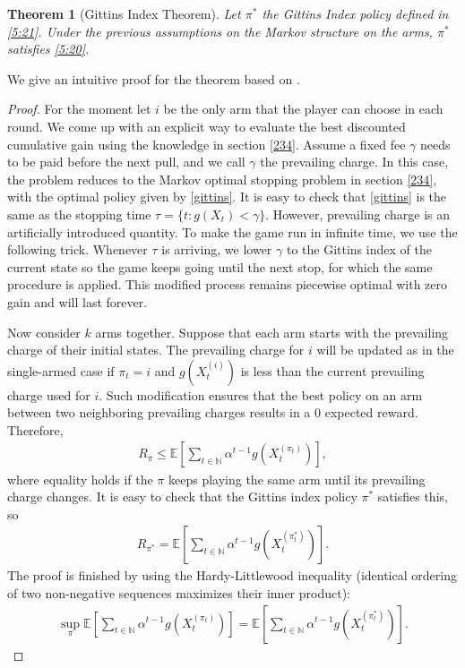 \documentclass[letterpaper,11pt,openright,openany]{book}
\numberwithin{equation}{section}
\theoremstyle{plain}
\newtheorem{Th}{Theorem}[section]
\theoremstyle{definition}
\def\N{{\mathbb N}}
\def\E{{\mathbb E}}
\begin{document}
\begin{Th}[Gittins Index Theorem]
Let $\pi^*$ the Gittins Index policy defined in \eqref{5:21}. Under the previous assumptions on the Markov structure on the arms, $\pi^*$ satisfies \eqref{5:20}. 
\end{Th}

We give an intuitive proof for the theorem based on \cite{Weber_1992}. 

\begin{proof}
For the moment let $i$ be the only arm that the player can choose in each round.
We come up with an explicit way to evaluate the best discounted cumulative gain using the knowledge in section \ref{234}.  
Assume a fixed fee $\gamma$ needs to be paid before the next pull, 
and we call $\gamma$ the prevailing charge. 
In this case, the problem reduces to the Markov optimal stopping problem in section \ref{234}, with the optimal policy given by \eqref{gittins}.
It is easy to check that \eqref{gittins} is the same as the stopping time $\tau=\{t: g(X_t)<\gamma\}$. 
However, prevailing charge is an artificially introduced quantity. 
To make the game run in infinite time, we use the following trick. 
Whenever $\tau$ is arriving, we lower $\gamma$ to the Gittins index of the current state so the game keeps going until the next stop, for which the same procedure is applied. 
This modified process remains piecewise optimal with zero gain and will last forever. 

Now consider $k$ arms together. Suppose that each arm starts with the prevailing charge of their initial states. 
The prevailing charge for $i$ will be updated as in the single-armed case if $\pi_t=i$ and $g(X_t^{(i)})$ is less than the current prevailing charge used for $i$. 
Such modification ensures that the best policy on an arm between two neighboring prevailing charges results in a $0$ expected reward. Therefore, 
\begin{align*}
R_\pi \leq \E\left[\sum_{t\in\N}\alpha^{t-1}g(X^{(\pi_t)}_t)\right],
\end{align*}
where equality holds if the $\pi$ keeps playing the same arm until its prevailing charge changes. It is easy to check that the Gittins index policy $\pi^*$ satisfies this, so
\begin{align*}
R_{\pi^*} = \E\left[\sum_{t\in\N}\alpha^{t-1}g(X^{(\pi^*_t)}_t)\right].
\end{align*} 
The proof is finished by using the Hardy-Littlewood inequality (identical ordering of two non-negative sequences maximizes their inner product):
\begin{align*}
\sup_{\pi}\E\left[\sum_{t\in\N}\alpha^{t-1}g(X^{(\pi_t)}_t)\right] = \E\left[\sum_{t\in\N}\alpha^{t-1}g(X^{(\pi^*_t)}_t)\right].
\end{align*}
\end{proof}
\end{document}
